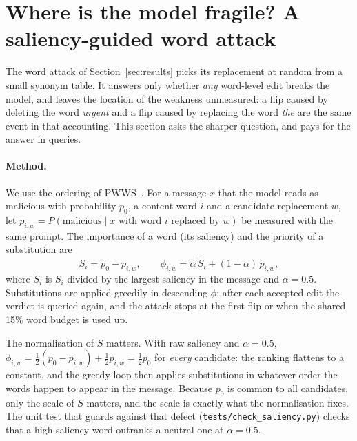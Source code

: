 \section{Where is the model fragile? A saliency-guided word attack}
\label{sec:saliency}

The word attack of Section~\ref{sec:results} picks its replacement at random from a
small synonym table. It answers only whether \emph{any} word-level edit breaks the model, and leaves
the location of the weakness unmeasured: a flip caused by deleting the word
\emph{urgent} and a flip caused by replacing the word \emph{the} are the same
event in that accounting. This section asks the sharper
question, and pays for the answer in queries.

\paragraph{Method.} We use the ordering of PWWS~\cite{ren2019pwws}. For a
message $x$ that the model reads as malicious with probability $p_0$, a content
word $i$ and a candidate replacement $w$, let $p_{i,w} = P(\text{malicious} \mid
x \text{ with word } i \text{ replaced by } w)$ be measured with the same prompt.
The importance of a word (its saliency) and the priority of a substitution are
\begin{equation}
S_i = p_0 - p_{i,w}, \qquad
\phi_{i,w} = \alpha \, \tilde{S}_i + (1-\alpha)\, p_{i,w},
\end{equation}
where $\tilde{S}_i$ is $S_i$ divided by the largest saliency in the message and
$\alpha = 0.5$. Substitutions are applied greedily in descending $\phi$; after
each accepted edit the verdict is queried again, and the attack stops at the
first flip or when the shared 15\% word budget is used up.

The normalisation of $S$ matters. With raw saliency and
$\alpha = 0.5$, $\phi_{i,w} = \tfrac{1}{2}(p_0 - p_{i,w}) + \tfrac{1}{2} p_{i,w}
= \tfrac{1}{2} p_0$ for \emph{every} candidate: the ranking flattens to a
constant, and the greedy loop then applies substitutions in whatever order the
words happen to appear in the message. Because $p_0$ is common to all candidates,
only the scale of $S$ matters, and the scale is exactly what the normalisation
fixes. The unit test that guards against that defect
(\texttt{tests/check\_saliency.py}) checks that a high-saliency word outranks a
neutral one at $\alpha = 0.5$.

